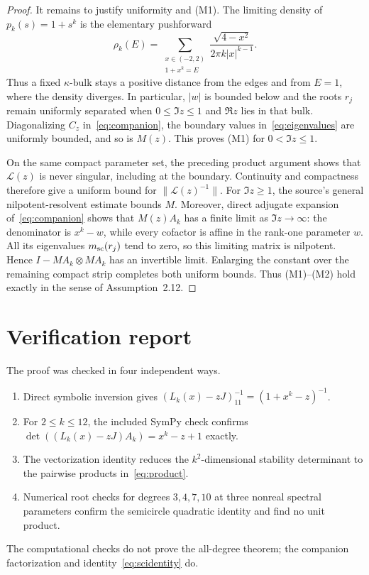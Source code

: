 \documentclass[11pt]{article}
\newcommand{\Lop}{\mathcal L}
\begin{document}
\begin{proof}
It remains to justify uniformity and (M1). The limiting density of
$p_k(s)=1+s^k$ is the elementary pushforward
\begin{equation}\label{eq:density}
 \rho_k(E)=
 \sum_{\substack{x\in(-2,2)\\1+x^k=E}}
 \frac{\sqrt{4-x^2}}{2\pi k|x|^{k-1}}.
\end{equation}
Thus a fixed $\kappa$-bulk stays a positive distance from the edges and from
$E=1$, where the density diverges. In particular, $|w|$ is bounded below and
the roots $r_j$ remain uniformly separated when $0\le\Im z\le1$ and
$\Re z$ lies in that bulk. Diagonalizing $C_z$ in~\eqref{eq:companion}, the
boundary values in~\eqref{eq:eigenvalues} are uniformly bounded, and so is
$M(z)$. This proves (M1) for $0<\Im z\le1$.

On the same compact parameter set, the preceding product argument shows that
$\Lop(z)$ is never singular, including at the boundary. Continuity and compactness
therefore give a uniform bound for $\|\Lop(z)^{-1}\|$. For $\Im z\ge1$, the
source's general nilpotent-resolvent estimate bounds $M$. Moreover, direct
adjugate expansion of~\eqref{eq:companion} shows that $M(z)A_k$ has a finite
limit as $\Im z\to\infty$: the denominator is $x^k-w$, while every cofactor is
affine in the rank-one parameter $w$. All its eigenvalues
$m_{\rm sc}(r_j)$ tend to zero, so this limiting matrix is nilpotent. Hence
$I-MA_k\otimes MA_k$ has an invertible limit. Enlarging the constant over the
remaining compact strip completes both uniform bounds. Thus (M1)--(M2) hold
exactly in the sense of Assumption~2.12.
\end{proof}

\section{Verification report}

The proof was checked in four independent ways.
\begin{enumerate}
\item Direct symbolic inversion gives
$(L_k(x)-zJ)^{-1}_{11}=(1+x^k-z)^{-1}$.
\item For $2\le k\le12$, the included SymPy check confirms
$\det((L_k(x)-zJ)A_k)=x^k-z+1$ exactly.
\item The vectorization identity reduces the $k^2$-dimensional stability
determinant to the pairwise products in~\eqref{eq:product}.
\item Numerical root checks for degrees $3,4,7,10$ at three nonreal spectral
parameters confirm the semicircle quadratic identity and find no unit product.
\end{enumerate}
The computational checks do not prove the all-degree theorem; the companion
factorization and identity~\eqref{eq:scidentity} do.
\end{document}
